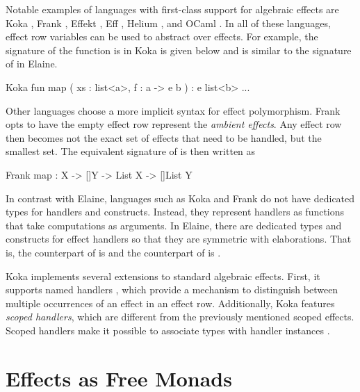 Notable examples of languages with first-class support for algebraic effects are Koka \autocite{leijen_koka_2014}, Frank \autocite{lindley_be_2017}, Effekt \autocite{bach_poulsen_hefty_2023}, Eff \autocite{bauer_programming_2015}, Helium \autocite{biernacki_abstracting_2019}, and OCaml \autocite{sivaramakrishnan_retrofitting_2021}. In all of these languages, effect row variables can be used to abstract over effects. For example, the signature of the  function is in Koka is given below and is similar to the signature of  in Elaine.

\begin{lst}{Koka}
fun map ( xs : list<a>, f : a -> e b ) : e list<b>
    ...
\end{lst}
%
Other languages choose a more implicit syntax for effect polymorphism. Frank \autocite{lindley_be_2017} opts to have the empty effect row represent the \emph{ambient effects}. Any effect row then becomes not the exact set of effects that need to be handled, but the smallest set. The equivalent signature of  is then written as

\begin{lst}{Frank}
map : {X -> []Y} -> List X -> []List Y
\end{lst}
%
In contrast with Elaine, languages such as Koka and Frank do not have dedicated types for handlers and  constructs. Instead, they represent handlers as functions that take computations as arguments. In Elaine, there are dedicated types and constructs for effect handlers so that they are symmetric with elaborations. That is, the counterpart of  is  and the counterpart of  is .

Koka implements several extensions to standard algebraic effects. First, it supports named handlers \autocite{xie_first-class_2022}, which provide a mechanism to distinguish between multiple occurrences of an effect in an effect row. Additionally, Koka features \emph{scoped handlers}, which are different from the previously mentioned scoped effects. Scoped handlers make it possible to associate types with handler instances \autocite{xie_first-class_2022}.

\section{Effects as Free Monads}

